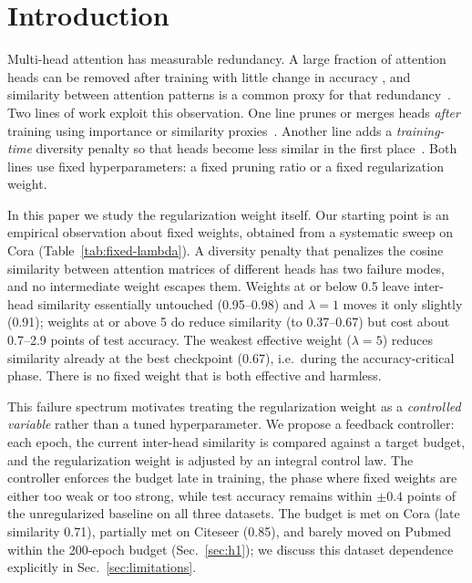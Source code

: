 \documentclass{ws-ijprai}
\begin{document}
\section{Introduction}

Multi-head attention has measurable redundancy. A large fraction of attention
heads can be removed after training with little change in accuracy
\cite{michel2019}, and similarity between attention patterns is a common proxy
for that redundancy~\cite{chai2024}. Two lines of work exploit this
observation. One line prunes or merges heads \emph{after} training using
importance or similarity proxies~\cite{michel2019,voita2019,chai2024,dha2024}.
Another line adds a \emph{training-time} diversity penalty so that heads become
less similar in the first place~\cite{nicolicioiu2023,deacon2024}. Both lines
use fixed hyperparameters: a fixed pruning ratio or a fixed regularization
weight.

In this paper we study the regularization weight itself. Our starting point is
an empirical observation about fixed weights, obtained from a systematic sweep
on Cora (Table~\ref{tab:fixed-lambda}). A diversity penalty that penalizes the
cosine similarity between attention matrices of different heads has two failure
modes, and no intermediate weight escapes them. Weights at or below 0.5 leave
inter-head similarity essentially untouched (0.95--0.98) and $\lambda=1$ moves
it only slightly (0.91); weights at or above 5 do reduce similarity (to
0.37--0.67) but cost about 0.7--2.9 points of test accuracy. The weakest
effective weight ($\lambda=5$) reduces similarity already at the best
checkpoint (0.67), i.e.\ during the accuracy-critical phase. There is no fixed
weight that is both effective and harmless.

This failure spectrum motivates treating the regularization weight as a
\emph{controlled variable} rather than a tuned hyperparameter. We propose a
feedback controller: each epoch, the current inter-head similarity is compared
against a target budget, and the regularization weight is adjusted by an
integral control law. The controller enforces the budget late in training, the
phase where fixed weights are either too weak or too strong, while test
accuracy remains within $\pm 0.4$ points of the unregularized baseline on all
three datasets. The budget is met on Cora (late similarity 0.71), partially
met on Citeseer (0.85), and barely moved on Pubmed within the 200-epoch
budget (Sec.~\ref{sec:h1}); we discuss this dataset dependence explicitly in
Sec.~\ref{sec:limitations}.
\end{document}
